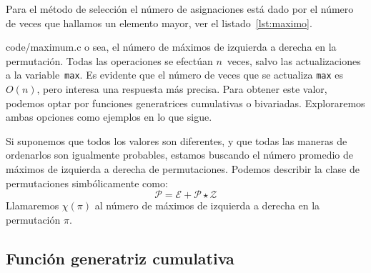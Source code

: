   Para el método de selección el número de asignaciones
  está dado por el número de veces que hallamos un elemento mayor,
  ver el listado~\ref{lst:maximo}.
  
                   {code/maximum.c}
  o sea,
  el número de máximos de izquierda a derecha en la permutación.
  Todas las operaciones se efectúan \(n\)~veces,
  salvo las actualizaciones a la variable~\lstinline[language = C]!max!.
  Es evidente que el número de veces que se actualiza
  \lstinline[language = C]!max! es \(O(n)\),
  pero interesa una respuesta más precisa.
  Para obtener este valor,
  podemos optar por funciones generatrices cumulativas
  o bivariadas.
  Exploraremos ambas opciones como ejemplos en lo que sigue.

  Si suponemos que todos los valores son diferentes,
  y que todas las maneras de ordenarlos son igualmente probables,
  estamos buscando el número promedio de máximos de izquierda a derecha
  de permutaciones.
  Podemos describir la clase de permutaciones simbólicamente
  como:
  \begin{equation}
    \label{eq:P-class-again}
    \mathscr{P}
      = \mathscr{E} + \mathscr{P} \star \mathscr{Z}
  \end{equation}
  Llamaremos \(\chi(\pi)\) al número de máximos de izquierda a derecha
  en la permutación \(\pi\).

\subsection{Función generatriz cumulativa}
\label{sec:max-fg-cumulativa}

